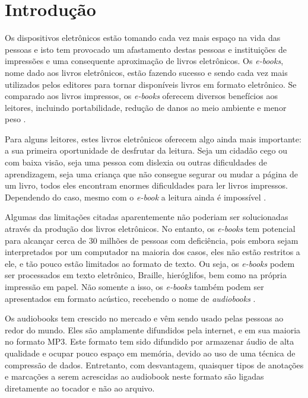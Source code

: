 \chapter[Introdução]{Introdução}\label{cap1}

Os dispositivos eletrônicos estão tomando cada vez mais espaço na vida das pessoas e isto tem provocado um afastamento destas pessoas e instituições de impressões e uma consequente aproximação de livros eletrônicos. Os \textit{e-books}, nome dado aos livros eletrônicos, estão fazendo sucesso e sendo cada vez mais utilizados pelos editores para tornar disponíveis livros em formato eletrônico. Se comparado aos livros impressos, os \textit{e-books} oferecem diversos benefícios aos leitores, incluindo portabilidade, redução de danos ao meio ambiente e menor peso \cite{printdisable}.

Para alguns leitores, estes livros eletrônicos oferecem algo ainda mais importante: a sua primeira oportunidade de desfrutar da leitura. Seja um cidadão cego ou com baixa visão, seja uma pessoa com dislexia ou outras dificuldades de aprendizagem, seja uma criança que não consegue segurar ou mudar a página de um livro, todos eles encontram enormes dificuldades para ler livros impressos. Dependendo do caso, mesmo com o \textit{e-book} a leitura ainda é impossível \cite{ebooks}.

Algumas das limitações citadas aparentemente não poderiam ser solucionadas através da produção dos livros eletrônicos. No entanto, os \textit{e-books} tem potencial para alcançar cerca de 30 milhões de pessoas com deficiência, pois embora sejam interpretados por um computador na maioria dos casos, eles não estão restritos a ele, e tão pouco estão limitados ao formato de texto. Ou seja, os \textit{e-books} podem ser processados em texto eletrônico, Braille, hieróglifos, bem como na própria impressão em papel. Não somente a isso, os \textit{e-books} também podem ser apresentados em formato acústico, recebendo o nome de \textit{audiobooks} \cite{ebooks}.

Os audiobooks tem crescido no mercado e vêm sendo usado pelas pessoas ao redor do mundo. Eles são amplamente difundidos pela internet, e em sua maioria no formato MP3. Este formato tem sido difundido por armazenar áudio de alta qualidade e ocupar pouco espaço em memória, devido ao uso de uma técnica de compressão de dados. Entretanto, com desvantagem, quaisquer tipos de anotações e marcações a serem acrescidas ao audiobook neste formato são ligadas diretamente ao tocador e não ao arquivo.

